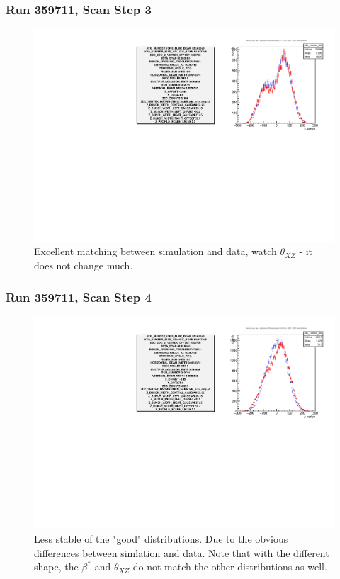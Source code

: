 \begin{frame}
\frametitle{Run 359711, Scan Step 3}
\begin{figure}
\begin{center}
\includegraphics[width=\linewidth]{"figs/359711_step_3_zdc_zvertex"}
\caption{Excellent matching between simulation and data, watch $\theta_{XZ}$ - it does not change much.}
\label{fig:359711_step_3_zdc_zvertex}
\end{center}\end{figure}
\end{frame}

\begin{frame}
\frametitle{Run 359711, Scan Step 4}
\begin{figure}
\begin{center}
\includegraphics[width=\linewidth]{"figs/359711_step_4_zdc_zvertex"}
\caption{Less stable of the "good" distributions. Due to the obvious differences between simlation and data. Note that with the different shape, the $\beta^*$ and $\theta_{XZ}$ do not match the other distributions as well.}
\label{fig:359711_step_4_zdc_zvertex}
\end{center}\end{figure}
\end{frame}

